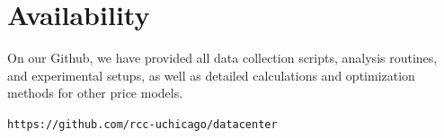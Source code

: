 \documentclass[letterpaper,twocolumn,10pt]{article}
\begin{document}
\section{Availability}

On our Github, we have provided all data collection scripts, analysis routines, and experimental setups, as well as detailed calculations and optimization methods for other price models.  

\begin{center}
{\tt https://github.com/rcc-uchicago/datacenter}
\end{center}

{\footnotesize 
}


\theendnotes
\end{document}
